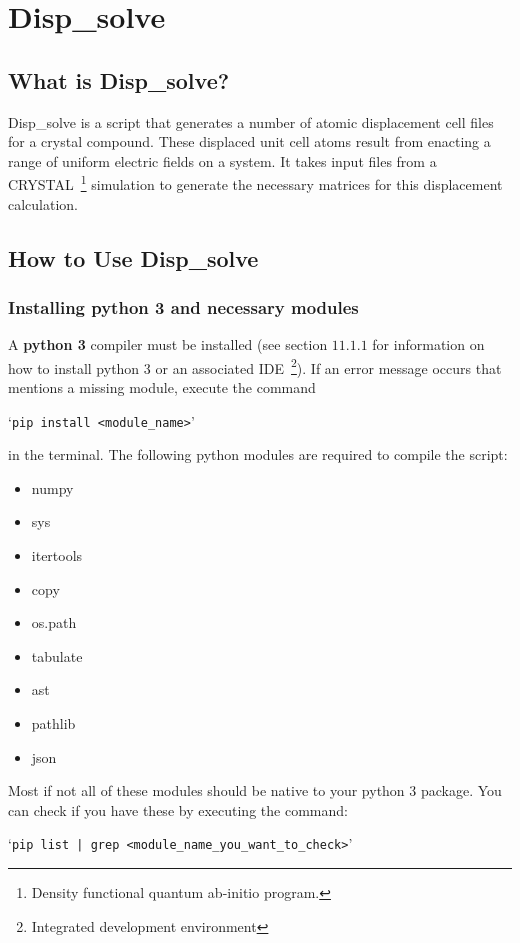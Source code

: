 \section{Disp\_solve}
\subsection{What is Disp\_solve?}
Disp\_solve is a script that generates a number of atomic displacement cell
files for a crystal compound. These displaced unit cell atoms result from
enacting a range of uniform electric fields on a system. It takes input files
from a CRYSTAL~\footnote{Density functional quantum ab-initio program.}
simulation to generate the necessary matrices for this displacement
calculation.

\subsection{How to Use Disp\_solve}
\subsubsection{Installing python 3 and necessary modules}
A \textbf{python 3} compiler must be installed (see section $11.1.1$ for
information on how to install python 3 or an associated IDE~\footnote{Integrated development environment}). If an error message occurs that
mentions a missing module, execute the command

`\texttt{pip install <module\_name>}'

in the terminal. The following python modules are required to compile
the script:
  \begin{itemize} \itemsep -0.5ex
 	\item numpy
 	\item sys
 	\item itertools
 	\item copy
 	\item os.path
 	\item tabulate
 	\item ast
 	\item pathlib
 	\item json
 \end{itemize}

Most if not all of these modules should be native to your python 3 package. You can check if you have these by executing the command:

`\texttt{pip list | grep <module\_name\_you\_want\_to\_check>}'

